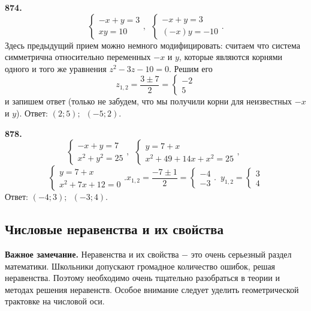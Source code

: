 \textbf{874.}  $$\begin{cases}-x+y=3\\ xy=10 \end{cases},\enspace \begin{cases}-x+y=3\\ (-x)y=-10 \end{cases}.$$ Здесь предыдущий прием можно немного модифицировать: считаем что система симметрична относительно переменных $-x$ и  $y$, которые являются корнями одного и того же уравнения $z^2-3z-10=0$. Решим его  $$z_{1,2}=\frac{3\pm7}{2}=\begin{cases}-2\\ 5 \end{cases}$$ и запишем ответ (только не забудем, что мы получили корни для неизвестных $-x$ и $y$). \newline \null \hspace*{\fill} Ответ: $(2;5);\enspace(-5;2)$. 

\textbf{878.} $$\begin{cases}-x+y=7\\ x^2+y^2=25 \end{cases},\enspace \begin{cases}y=7+x\\ x^2+49+14x+x^2=25 \end{cases},\enspace $$$$\begin{cases}y=7+x\\ x^2+7x+12=0 \end{cases}.x_{1,2}=\frac{-7\pm1}{2}=\begin{cases}-4\\-3 \end{cases}.\enspace y_{1,2}=\begin{cases}3\\4 \end{cases}$$ \newline \null \hspace*{\fill} Ответ: $(-4;3);\enspace(-3;4)$.


\subsection{Числовые неравенства и их свойства}


\textbf{Важное замечание.} Неравенства и их свойства $-$ это очень серьезный раздел математики. Школьники допускают громадное количество ошибок, решая неравенства. Поэтому необходимо очень тщательно разобраться в теории и методах решения неравенств. Особое внимание следует уделить геометрической трактовке на числовой оси.

